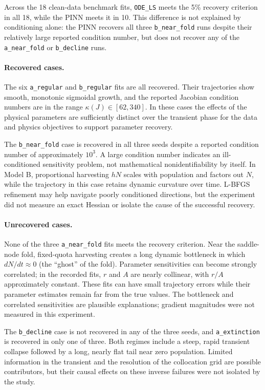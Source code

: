Across the 18 clean-data benchmark fits, \texttt{ODE\_LS} meets the 5\%
recovery criterion in all 18, while the PINN meets it in 10. This difference
is not explained by conditioning alone: the PINN recovers all three
\texttt{b\_near\_fold} runs despite their relatively large reported
condition number, but does not recover any of the
\texttt{a\_near\_fold} or \texttt{b\_decline} runs.

\paragraph{Recovered cases.}
The six \texttt{a\_regular} and \texttt{b\_regular} fits are all recovered.
Their trajectories show smooth, monotonic sigmoidal growth, and the
reported Jacobian condition numbers are in the range
$\kappa(J)\in[62,340]$. In these cases the effects of the physical
parameters are sufficiently distinct over the transient phase for the
data and physics objectives to support parameter recovery.

The \texttt{b\_near\_fold} case is recovered in all three seeds despite a
reported condition number of approximately $10^3$. A large condition
number indicates an ill-conditioned sensitivity problem, not mathematical
nonidentifiability by itself. In Model B, proportional harvesting $hN$
scales with population and factors out $N$, while the trajectory in this
case retains dynamic curvature over time. L-BFGS refinement may help
navigate poorly conditioned directions, but the experiment did not measure
an exact Hessian or isolate the cause of the successful recovery.

\paragraph{Unrecovered cases.}
None of the three \texttt{a\_near\_fold} fits meets the recovery criterion.
Near the saddle-node fold, fixed-quota harvesting creates a long dynamic
bottleneck in which $dN/dt\approx0$ (the ``ghost'' of the fold). Parameter
sensitivities can become strongly correlated; in the recorded fits, $r$
and $A$ are nearly collinear, with $r/A$ approximately constant. These fits
can have small trajectory errors while their parameter estimates remain
far from the true values. The bottleneck and correlated sensitivities are
plausible explanations; gradient magnitudes were not measured in this
experiment.

The \texttt{b\_decline} case is not recovered in any of the three seeds,
and \texttt{a\_extinction} is recovered in only one of three. Both regimes
include a steep, rapid transient collapse followed by a long, nearly flat
tail near zero population. Limited information in the transient and the
resolution of the collocation grid are possible contributors, but their
causal effects on these inverse failures were not isolated by the study.

